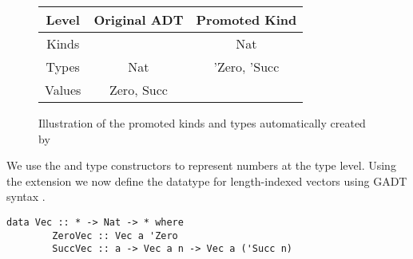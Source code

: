 \begin{figure}[h]
    \centering
    \begin{tabular}{ |c|c|c| } 
        \hline
        Level & Original ADT & Promoted Kind \\
        \hline 
        Kinds &  & Nat \\
        Types & Nat & 'Zero, 'Succ \\
        Values & Zero, Succ & \\
        \hline
    \end{tabular}
    \caption{Illustration of the promoted kinds and types automatically created by }
    \label{fig:datakindsPromotion}
\end{figure}


We use the  and  type constructors to represent numbers at the type level. Using the  extension we now define the datatype for length-indexed vectors using GADT syntax \cite{GADTs}.

\begin{lstlisting}[morekeywords={a, n}]
    data Vec :: * -> Nat -> * where
        ZeroVec :: Vec a 'Zero
        SuccVec :: a -> Vec a n -> Vec a ('Succ n)
\end{lstlisting}

